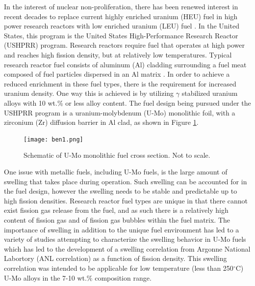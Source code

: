 \documentclass[review]{elsarticle}
\begin{document}
In the interest of nuclear non-proliferation, there has been renewed interest in recent decades to replace current highly enriched uranium (HEU) fuel in high power research reactors with low enriched uranium (LEU) fuel \cite{snelgrove1997}. In the United States, this program is the United States High-Performance Research Reactor (USHPRR) program. Research reactors require fuel that operates at high power and reaches high fission density, but at relatively low temperatures. Typical research reactor fuel consists of aluminum (Al) cladding surrounding a fuel meat composed of fuel particles dispersed in an Al matrix \cite{meyer2014}. In order to achieve a reduced enrichment in these fuel types, there is the requirement for increased uranium density. One way this is achieved is by utilizing $\gamma$ stabilized uranium alloys with 10 wt.\% or less alloy content. The fuel design being pursued under the USHPRR program is a uranium-molybdenum (U-Mo) monolithic foil, with a zirconium (Zr) diffusion barrier in Al clad, as shown in Figure \ref{fig:ben1}. 

\begin{figure}[!h]
 \centering
 \texttt{[image: ben1.png]} 
 \caption{Schematic of U-Mo monolithic fuel cross section. Not to scale.}
 \label{fig:ben1}
\end{figure}

\FloatBarrier

One issue with metallic fuels, including U-Mo fuels, is the large amount of swelling that takes place during operation\cite{hofman1997}. Such swelling can be accounted for in the fuel design, however the swelling needs to be stable and predictable up to high fission densities. Research reactor fuel types are unique in that there cannot exist fission gas release from the fuel, and as such there is a relatively high content of fission gas and of fission gas bubbles within the fuel matrix. The importance of swelling in addition to the unique fuel environment has led to a variety of studies attempting to characterize the swelling behavior in U-Mo fuels \cite{rest2009, kim_anl08, meyer2002, kim2013} which has led to the development of a swelling correlation from Argonne National Labortory (ANL correlation) \cite{kim2011} as a function of fission density. This swelling correlation was intended to be applicable for low temperature (less than 250$^{\circ}$C) U-Mo alloys in the 7-10 wt.\% composition range. 
\end{document}
